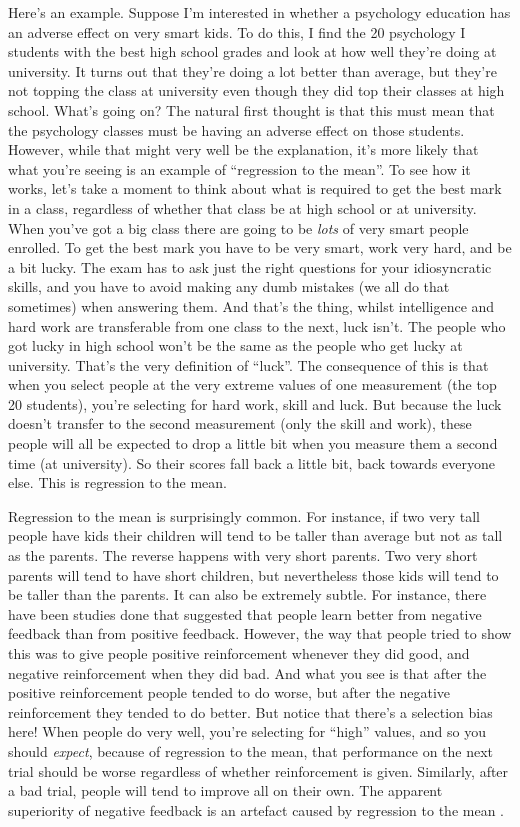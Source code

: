 \documentclass[
]{book}
\begin{document}
Here's an example. Suppose I'm interested in whether a psychology education has an adverse effect on very smart kids. To do this, I find the 20 psychology I students with the best high school grades and look at how well they're doing at university. It turns out that they're doing a lot better than average, but they're not topping the class at university even though they did top their classes at high school. What's going on? The natural first thought is that this must mean that the psychology classes must be having an adverse effect on those students. However, while that might very well be the explanation, it's more likely that what you're seeing is an example of ``regression to the mean''. To see how it works, let's take a moment to think about what is required to get the best mark in a class, regardless of whether that class be at high school or at university. When you've got a big class there are going to be \emph{lots} of very smart people enrolled. To get the best mark you have to be very smart, work very hard, and be a bit lucky. The exam has to ask just the right questions for your idiosyncratic skills, and you have to avoid making any dumb mistakes (we all do that sometimes) when answering them. And that's the thing, whilst intelligence and hard work are transferable from one class to the next, luck isn't. The people who got lucky in high school won't be the same as the people who get lucky at university. That's the very definition of ``luck''. The consequence of this is that when you select people at the very extreme values of one measurement (the top 20 students), you're selecting for hard work, skill and luck. But because the luck doesn't transfer to the second measurement (only the skill and work), these people will all be expected to drop a little bit when you measure them a second time (at university). So their scores fall back a little bit, back towards everyone else. This is regression to the mean.

Regression to the mean is surprisingly common. For instance, if two very tall people have kids their children will tend to be taller than average but not as tall as the parents. The reverse happens with very short parents. Two very short parents will tend to have short children, but nevertheless those kids will tend to be taller than the parents. It can also be extremely subtle. For instance, there have been studies done that suggested that people learn better from negative feedback than from positive feedback. However, the way that people tried to show this was to give people positive reinforcement whenever they did good, and negative reinforcement when they did bad. And what you see is that after the positive reinforcement people tended to do worse, but after the negative reinforcement they tended to do better. But notice that there's a selection bias here! When people do very well, you're selecting for ``high'' values, and so you should \emph{expect}, because of regression to the mean, that performance on the next trial should be worse regardless of whether reinforcement is given. Similarly, after a bad trial, people will tend to improve all on their own. The apparent superiority of negative feedback is an artefact caused by regression to the mean \citep[see][ for discussion]{Kahneman1973}.
\end{document}
